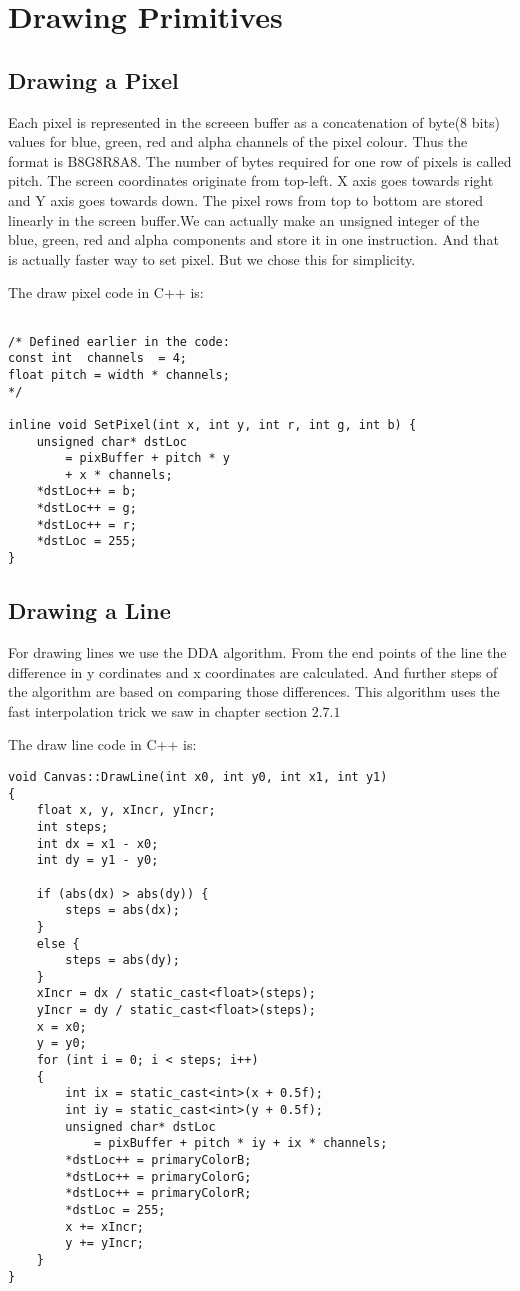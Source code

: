 \chapter{Drawing Primitives}
\section{Drawing a Pixel}
Each pixel is represented in the screeen buffer as a concatenation of byte(8 bits) values for blue, green, red and alpha channels of the pixel colour. Thus the format is B8G8R8A8. The number of bytes required for one row of pixels is called pitch. The screen coordinates originate from top-left. X axis goes towards right and Y axis goes towards down. The pixel rows from top to bottom are stored linearly in the screen buffer.We can actually make an unsigned integer of the blue, green, red and alpha components and store it in one instruction. And that is actually faster way to set pixel. But we chose this for simplicity.

The draw pixel code in C++ is:\\
\lstset{style=cpp}
\begin{lstlisting}

/* Defined earlier in the code:
const int  channels  = 4;
float pitch = width * channels;
*/

inline void SetPixel(int x, int y, int r, int g, int b) {
	unsigned char* dstLoc 
		= pixBuffer + pitch * y 
		+ x * channels;
	*dstLoc++ = b;
	*dstLoc++ = g;
	*dstLoc++ = r;
	*dstLoc = 255;
}
\end{lstlisting}
\clearpage 

\section{Drawing a Line}
For drawing lines we use the DDA algorithm. From the end points of the line the difference in y cordinates and x coordinates are calculated. And further steps of the algorithm are based on comparing those differences. This algorithm uses the fast interpolation trick we saw in chapter section $2.7.1$

The draw line code in C++ is:\\
\lstset{style=cpp}
\begin{lstlisting}
void Canvas::DrawLine(int x0, int y0, int x1, int y1)
{
	float x, y, xIncr, yIncr;
	int steps;
	int dx = x1 - x0;
	int dy = y1 - y0;

	if (abs(dx) > abs(dy)) {
		steps = abs(dx);
	}
	else {
		steps = abs(dy);
	}
	xIncr = dx / static_cast<float>(steps);
	yIncr = dy / static_cast<float>(steps);
	x = x0;
	y = y0;
	for (int i = 0; i < steps; i++)
	{
		int ix = static_cast<int>(x + 0.5f);
		int iy = static_cast<int>(y + 0.5f);
		unsigned char* dstLoc 
			= pixBuffer + pitch * iy + ix * channels;
		*dstLoc++ = primaryColorB;
		*dstLoc++ = primaryColorG;
		*dstLoc++ = primaryColorR;
		*dstLoc = 255;
		x += xIncr;
		y += yIncr;
	}
}
\end{lstlisting}

